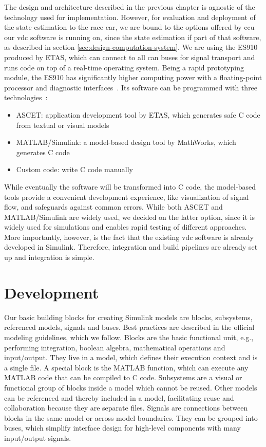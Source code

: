 The design and architecture described in the previous chapter is agnostic of the technology used for implementation. However, for evaluation and deployment of the state estimation to the race car, we are bound to the options offered by \gls{ecu} our \gls{vdc} software is running on, since the state estimation if part of that software, as described in section \ref{sec:design-computation-system}. We are using the ES910 produced by ETAS, which can connect to all \gls{can} buses for signal transport and runs code on top of a real-time operating system. Being a rapid prototyping module, the ES910 has significantly higher computing power with a floating-point processor and diagnostic interfaces~\cite[p.~16]{ETASGmbHStuttgart.2018}. Its software can be programmed with three technologies~\cites[p.~17]{ETASGmbHStuttgart.2018}[p.~10]{ETASGmbHStuttgart.2019}:
\begin{itemize}
\item ASCET: application development tool by ETAS, which generates safe C code from textual or visual models
\item MATLAB/Simulink: a model-based design tool by MathWorks, which generates C code
\item Custom code: write C code manually
\end{itemize}
While eventually the software will be transformed into C code, the model-based tools provide a convenient development experience, like visualization of signal flow, and safeguards against common errors. While both ASCET and MATLAB/Simulink are widely used, we decided on the latter option, since it is widely used for simulations and enables rapid testing of different approaches. More importantly, however, is the fact that the existing \gls{vdc} software is already developed in Simulink. Therefore, integration and build pipelines are already set up and integration is simple.


\section{Development}
Our basic building blocks for creating Simulink models are blocks, subsystems, referenced models, signals and buses. Best practices are described in the official modeling guidelines\cite{TheMathWorksInc..2020}, which we follow. Blocks are the basic functional unit, e.g., performing integration, boolean algebra, mathematical operations and input/output. They live in a model, which defines their execution context and is a single file. A special block is the MATLAB function, which can execute any MATLAB code that can be compiled to C code. Subsystems are a visual or functional group of blocks inside a model which cannot be reused. Other models can be referenced and thereby included in a model, facilitating reuse and collaboration because they are separate files. Signals are connections between blocks in the same model or across model boundaries. They can be grouped into buses, which simplify interface design for high-level components with many input/output signals.

